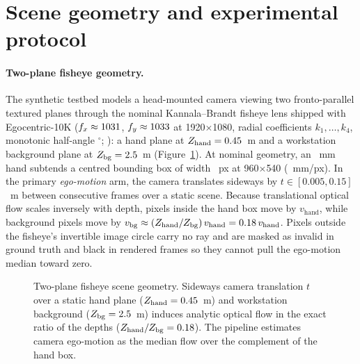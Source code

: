 \documentclass[11pt]{article}
\begin{document}
\section{Scene geometry and experimental protocol}
\label{sec:protocol}

\paragraph{Two-plane fisheye geometry.}
The synthetic testbed models a head-mounted camera viewing two fronto-parallel textured planes
through the nominal Kannala--Brandt fisheye lens shipped with Egocentric-10K
($f_x \approx 1031{}$, $f_y \approx 1033{}$ at 1920$\times$1080, radial coefficients
$k_1,\dots,k_4$, monotonic half-angle \cgHalfAngle{}$^\circ$; \citep{kannala2006,buildai2025corpus}):
a hand plane at $Z_{\mathrm{hand}} = 0.45{}$~m and a workstation background plane at
$Z_{\mathrm{bg}} = 2.5{}$~m (Figure~\ref{fig:geometry}). At nominal geometry, an
\cgHandBreadth{}~mm hand subtends a centred bounding box of width \cgBoxWidthNom{}~px at
960$\times$540 (\cgMmPerPx{}~mm/px). In the primary \emph{ego-motion} arm, the camera translates
sideways by $t \in [0.005, 0.15]$~m between consecutive frames over a static scene. Because
translational optical flow scales inversely with depth, pixels inside the hand box move by
$v_{\mathrm{hand}}$, while background pixels move by
$v_{\mathrm{bg}} \approx (Z_{\mathrm{hand}}/Z_{\mathrm{bg}})\,v_{\mathrm{hand}} = 0.18{}\,v_{\mathrm{hand}}$.
Pixels outside the fisheye's invertible image circle carry no ray and are masked as invalid in
ground truth and black in rendered frames so they cannot pull the ego-motion median toward zero.

\begin{figure}[t]
\centering

\caption{Two-plane fisheye scene geometry. Sideways camera translation $t$ over a static hand
plane ($Z_{\mathrm{hand}} = 0.45{}$~m) and workstation background ($Z_{\mathrm{bg}} =
2.5{}$~m) induces analytic optical flow in the exact ratio of the depths
($Z_{\mathrm{hand}}/Z_{\mathrm{bg}} = 0.18{}$). The pipeline estimates camera ego-motion as
the median flow over the complement of the hand box.}
\label{fig:geometry}
\end{figure}
\end{document}
